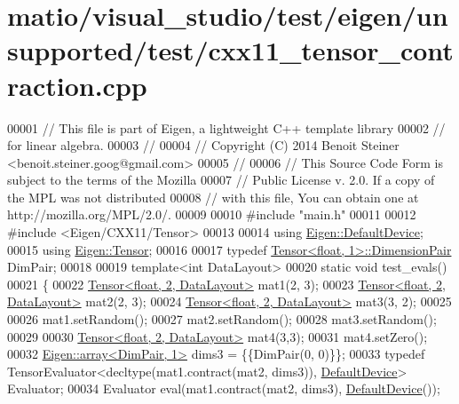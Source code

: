 \hypertarget{matio_2visual__studio_2test_2eigen_2unsupported_2test_2cxx11__tensor__contraction_8cpp_source}{}\section{matio/visual\+\_\+studio/test/eigen/unsupported/test/cxx11\+\_\+tensor\+\_\+contraction.cpp}
\label{matio_2visual__studio_2test_2eigen_2unsupported_2test_2cxx11__tensor__contraction_8cpp_source}

\begin{DoxyCode}
00001 \textcolor{comment}{// This file is part of Eigen, a lightweight C++ template library}
00002 \textcolor{comment}{// for linear algebra.}
00003 \textcolor{comment}{//}
00004 \textcolor{comment}{// Copyright (C) 2014 Benoit Steiner <benoit.steiner.goog@gmail.com>}
00005 \textcolor{comment}{//}
00006 \textcolor{comment}{// This Source Code Form is subject to the terms of the Mozilla}
00007 \textcolor{comment}{// Public License v. 2.0. If a copy of the MPL was not distributed}
00008 \textcolor{comment}{// with this file, You can obtain one at http://mozilla.org/MPL/2.0/.}
00009 
00010 \textcolor{preprocessor}{#include "main.h"}
00011 
00012 \textcolor{preprocessor}{#include <Eigen/CXX11/Tensor>}
00013 
00014 \textcolor{keyword}{using} \hyperlink{struct_eigen_1_1_default_device}{Eigen::DefaultDevice};
00015 \textcolor{keyword}{using} \hyperlink{class_eigen_1_1_tensor}{Eigen::Tensor};
00016 
00017 \textcolor{keyword}{typedef} \hyperlink{class_eigen_1_1_tensor}{Tensor<float, 1>::DimensionPair} DimPair;
00018 
00019 \textcolor{keyword}{template}<\textcolor{keywordtype}{int} DataLayout>
00020 \textcolor{keyword}{static} \textcolor{keywordtype}{void} test\_evals()
00021 \{
00022   \hyperlink{class_eigen_1_1_tensor}{Tensor<float, 2, DataLayout>} mat1(2, 3);
00023   \hyperlink{class_eigen_1_1_tensor}{Tensor<float, 2, DataLayout>} mat2(2, 3);
00024   \hyperlink{class_eigen_1_1_tensor}{Tensor<float, 2, DataLayout>} mat3(3, 2);
00025 
00026   mat1.setRandom();
00027   mat2.setRandom();
00028   mat3.setRandom();
00029 
00030   \hyperlink{class_eigen_1_1_tensor}{Tensor<float, 2, DataLayout>} mat4(3,3);
00031   mat4.setZero();
00032   \hyperlink{class_eigen_1_1array}{Eigen::array<DimPair, 1>} dims3 = \{\{DimPair(0, 0)\}\};
00033   \textcolor{keyword}{typedef} TensorEvaluator<decltype(mat1.contract(mat2, dims3)), \hyperlink{struct_eigen_1_1_default_device}{DefaultDevice}> Evaluator;
00034   Evaluator eval(mat1.contract(mat2, dims3), \hyperlink{struct_eigen_1_1_default_device}{DefaultDevice}());

\end{DoxyCode}
